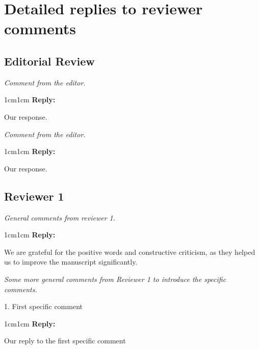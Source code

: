 \documentclass[rightcolwidth=.38]{ugent-note}
\newenvironment{reviewer}{\itshape}{}
\newenvironment{reply}{%
    \begin{adjustwidth}{1cm}{1cm}%
    \color{grayreply}\textbf{Reply:\ }%
    \ignorespaces%
}{\end{adjustwidth}}
\begin{document}
\section*{Detailed replies to reviewer comments}

\subsection*{Editorial Review}

\begin{minipage}{\linewidth}
    \begin{reviewer}
        Comment from the editor.
    \end{reviewer}

    \begin{reply}
        Our response.
    \end{reply}
\end{minipage}

\begin{minipage}{\linewidth}
    \begin{reviewer}
        Comment from the editor.
    \end{reviewer}

    \begin{reply}
        Our response.
    \end{reply}
\end{minipage}


\subsection*{Reviewer 1}

\begin{minipage}{\linewidth}
    \begin{reviewer}
        General comments from reviewer 1.
    \end{reviewer}

    \begin{reply}
        We are grateful for the positive words and constructive criticism, as they helped us to improve the manuscript significantly.
    \end{reply}
\end{minipage}


\begin{minipage}{\linewidth}
    \begin{reviewer}
        Some more general comments from Reviewer 1 to introduce the specific comments.

        1. First specific comment
    \end{reviewer}

    \begin{reply}
        Our reply to the first specific comment
    \end{reply}
\end{minipage}
\end{document}
